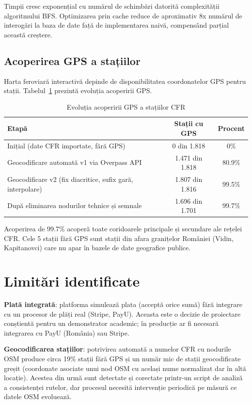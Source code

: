 \documentclass[12pt,a4paper]{report}
\begin{document}
Timpii cresc exponențial cu numărul de schimbări datorită complexității algoritmului BFS. Optimizarea prin cache reduce de aproximativ 8x numărul de interogări la baza de date față de implementarea naivă, compensând parțial această creștere.

\subsection{Acoperirea GPS a stațiilor}

Harta feroviară interactivă depinde de disponibilitatea coordonatelor GPS pentru stații. Tabelul~\ref{tab:gps} prezintă evoluția acoperirii GPS.

\begin{table}[ht]\small\linespread{1}
\caption{Evoluția acoperirii GPS a stațiilor CFR}
\label{tab:gps}
\begin{tabular}{l c c}
\textbf{Etapă} & \textbf{Stații cu GPS} & \textbf{Procent} \\\hline
Inițial (date CFR importate, fără GPS) & 0 din 1.818 & 0\% \\
Geocodificare automată v1 via Overpass API & 1.471 din 1.818 & 80.9\% \\
Geocodificare v2 (fix diacritice, sufix gară, interpolare) & 1.807 din 1.816 & 99.5\% \\
După eliminarea nodurilor tehnice și semnale & 1.696 din 1.701 & 99.7\% \\
\hline
\end{tabular}
\end{table}

Acoperirea de 99.7\% acoperă toate coridoarele principale și secundare ale rețelei CFR. Cele 5 stații fără GPS sunt stații din afara granițelor României (Vidin, Kapitanovci) care nu apar în bazele de date geografice publice.

\section{Limitări identificate}

\textbf{Plată integrată}: platforma simulează plata (acceptă orice sumă) fără integrare cu un procesor de plăți real (Stripe, PayU). Aceasta este o decizie de proiectare conștientă pentru un demonstrator academic; în producție ar fi necesară integrarea cu PayU (România) sau Stripe.

\textbf{Geocodificarea stațiilor}: potrivirea automată a numelor CFR cu nodurile OSM produce circa 19\% stații fără GPS și un număr mic de stații geocodificate greșit (coordonate asociate unui nod OSM cu același nume normalizat dar în altă locație). Acestea din urmă sunt detectate și corectate printr-un script de analiză a consistenței rutelor, dar procesul necesită intervenție periodică pe măsură ce datele OSM evoluează.
\end{document}
